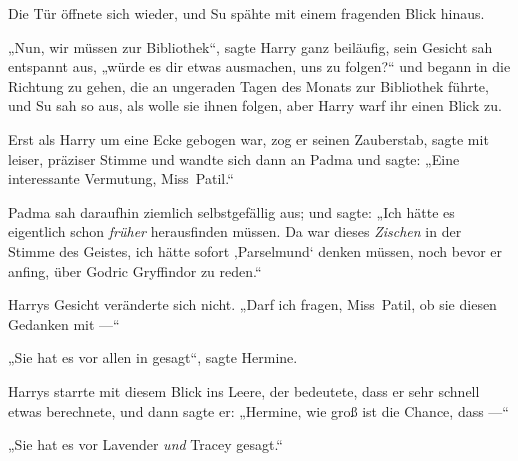 Die Tür öffnete sich wieder, und Su spähte mit einem fragenden Blick hinaus.

„Nun, wir müssen zur Bibliothek“, sagte Harry ganz beiläufig, sein Gesicht sah entspannt aus, „würde es dir etwas ausmachen, uns zu folgen?“ und begann in die Richtung zu gehen, die an ungeraden Tagen des Monats zur Bibliothek führte, und Su sah so aus, als wolle sie ihnen folgen, aber Harry warf ihr einen Blick zu.

Erst als Harry um eine Ecke gebogen war, zog er seinen Zauberstab, sagte mit leiser, präziser Stimme  und wandte sich dann an Padma und sagte:
„Eine interessante Vermutung, Miss~Patil.“

Padma sah daraufhin ziemlich selbstgefällig aus; und sagte:
„Ich hätte es eigentlich schon \emph{früher} herausfinden müssen. Da war dieses \emph{Zischen} in der Stimme des Geistes, ich hätte sofort ‚Parselmund‘ denken müssen, noch bevor er anfing, über Godric Gryffindor zu reden.“

Harrys Gesicht veränderte sich nicht.
„Darf ich fragen, Miss~Patil, ob sie diesen Gedanken mit —“

„Sie hat es vor allen in \SPHEW gesagt“, sagte Hermine.

Harrys starrte mit diesem Blick ins Leere, der bedeutete, dass er sehr schnell etwas berechnete, und dann sagte er:
„Hermine, wie groß ist die Chance, dass —“

„Sie hat es vor Lavender \emph{und} Tracey gesagt.“

